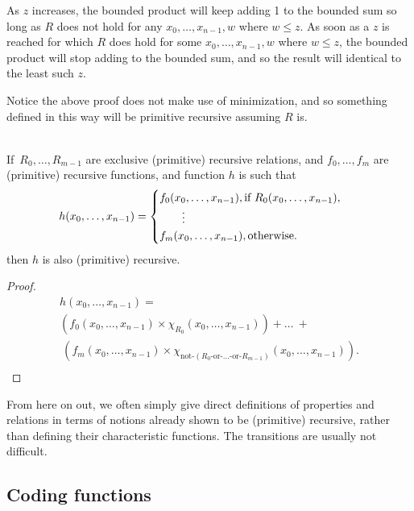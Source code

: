 \documentclass[12pt]{report}
\theoremstyle{nonumberplain}
\newtheorem{proof}{Proof}
\begin{document}
\noindent As $z$ increases, the bounded product will keep adding 1 to the bounded sum so long as $R$ does not hold for any $x_0, \dotsc , x_{n-1}, w$ where $w \le z$. As soon as a $z$ is reached for which $R$ does hold for some $x_0, \dotsc , x_{n-1}, w$ where $w \le z$, the bounded product will stop adding to the bounded sum, and so the result will identical to the least such $z$.


Notice the above proof does not make use of minimization, and so something defined in this way will be primitive recursive assuming $R$ is.

\begin{mt}
~\\If \,$R_0, \dotsc, R_{m-1}$ are exclusive (primitive) recursive relations, and $f_0, \dotsc, f_m$ are (primitive) recursive functions, and function $h$ is such that
\begin{equation*}
\hspace*{-0.5em} h(x_0, \dotsc, x_{n-1}) = \begin{cases}
f_0(x_0, \dotsc, x_{n-1}),\text{if }R_0(x_0, \dotsc, x_{n-1}),\\
\qquad \vdots \qquad\\
f_m(x_0, \dotsc, x_{n-1}),\text{otherwise}.
\end{cases}
\end{equation*}
then $h$ is also (primitive) recursive.
\end{mt}
\begin{proof}
\begin{multline*}
h(x_0, \dotsc, x_{n-1}) = \\ (f_0(x_0, \dotsc, x_{n-1}) × χ_{R_0}(x_0, \dotsc, x_{n-1})) + \dots\ + \\
~(f_m(x_0, \dotsc, x_{n-1}) × χ_{\text{not-}(R_0\text{-or-\ldots-or-}R_{m-1})}(x_0, \dotsc, x_{n-1})).\\~
\end{multline*}
\end{proof}

\noindent From here on out, we often simply give direct definitions of properties and relations in terms of notions already shown to be (primitive) recursive, rather than defining their characteristic functions. The transitions are usually not difficult.

\subsection*{Coding functions}
\end{document}
